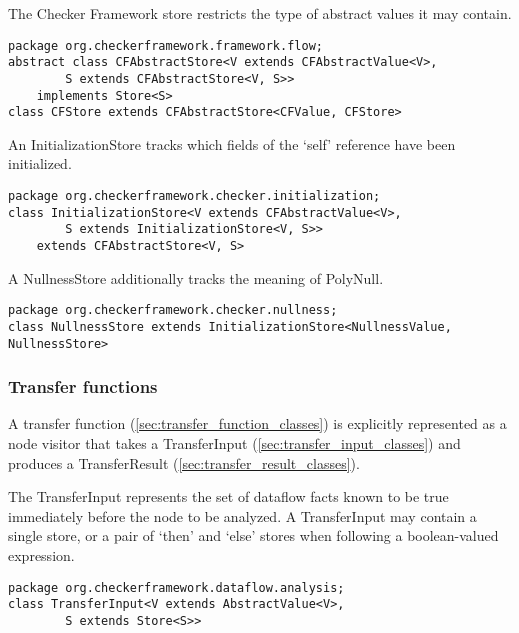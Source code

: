 The Checker Framework store restricts the type of abstract values it
may contain.

\begin{verbatim}
package org.checkerframework.framework.flow;
abstract class CFAbstractStore<V extends CFAbstractValue<V>,
        S extends CFAbstractStore<V, S>>
    implements Store<S>
class CFStore extends CFAbstractStore<CFValue, CFStore>
\end{verbatim}

An InitializationStore tracks which fields of the `self' reference
have been initialized.

\begin{verbatim}
package org.checkerframework.checker.initialization;
class InitializationStore<V extends CFAbstractValue<V>,
        S extends InitializationStore<V, S>>
    extends CFAbstractStore<V, S>
\end{verbatim}

A NullnessStore additionally tracks the meaning of PolyNull.

\begin{verbatim}
package org.checkerframework.checker.nullness;
class NullnessStore extends InitializationStore<NullnessValue, NullnessStore>
\end{verbatim}


\subsubsection{Transfer functions}
\label{sec:transfer_functions}

A transfer function (\autoref{sec:transfer_function_classes}) is
explicitly represented as a node visitor that takes a TransferInput
(\autoref{sec:transfer_input_classes}) and produces a TransferResult
(\autoref{sec:transfer_result_classes}).

\label{sec:transfer_input_classes}

The TransferInput represents the set of dataflow facts known to be
true immediately before the node to be analyzed.  A TransferInput may
contain a single store, or a pair of `then' and `else' stores when
following a boolean-valued expression.

\begin{verbatim}
package org.checkerframework.dataflow.analysis;
class TransferInput<V extends AbstractValue<V>,
        S extends Store<S>>
\end{verbatim}

\label{sec:transfer_result_classes}

